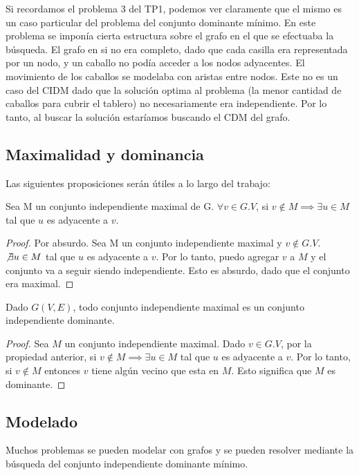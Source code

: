 Si recordamos el problema 3 del TP1, podemos ver claramente que el mismo es un caso particular del problema del conjunto dominante mínimo. En este problema se imponía cierta estructura sobre el grafo en el que se efectuaba la búsqueda. El grafo en si no era completo, dado que cada casilla era representada por un nodo, y un caballo no podía acceder a los nodos adyacentes. El movimiento de los caballos se modelaba con aristas entre nodos. Este no es un caso del CIDM dado que la solución optima al problema (la menor cantidad de caballos para cubrir el tablero) no necesariamente era independiente. Por lo tanto, al buscar la solución estaríamos buscando el CDM del grafo.

\subsection{Maximalidad y dominancia}

Las siguientes proposiciones serán útiles a lo largo del trabajo:

\begin{proposition}
Sea M un conjunto independiente maximal de G. $\forall v \in G.V$, si $v \notin M \implies \exists u \in M$ tal que $u$ es adyacente a $v$. 
\end{proposition}

\begin{proof}
Por absurdo. Sea M un conjunto independiente maximal y $v \notin G.V$. $\not\exists u \in M$ tal que $u$ es adyacente a $v$. Por lo tanto, puedo agregar $v$ a $M$ y el conjunto va a seguir siendo independiente. Esto es absurdo, dado que el conjunto era maximal.
\end{proof}

\begin{proposition}
Dado $G(V,E)$, todo conjunto independiente maximal es un conjunto independiente dominante.
\end{proposition}

\begin{proof}
Sea $M$ un conjunto independiente maximal. Dado $v \in G.V$, por la propiedad anterior, si $v \notin M \implies \exists u \in M$ tal que $u$ es adyacente a $v$. Por lo tanto, si $v \notin M$ entonces $v$ tiene algún vecino que esta en $M$. Esto significa que $M$ es dominante.
\end{proof}

\newpage

\subsection{Modelado}
Muchos problemas se pueden modelar con grafos y se pueden resolver mediante la búsqueda del conjunto independiente dominante mínimo.

